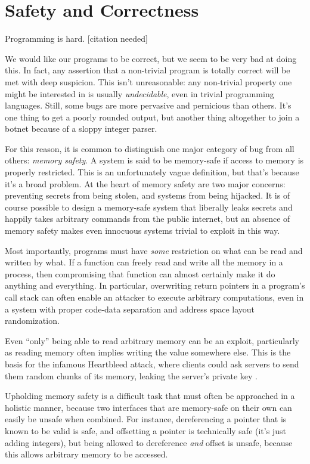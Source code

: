 \chapter{Safety and Correctness}
\label{ch:problems}

Programming is hard. [citation needed]

We would like our programs to be correct, but we seem to be very bad at doing
this. In fact, any assertion that a non-trivial program is totally correct
will be met with deep suspicion. This isn't unreasonable: any non-trivial property
one might be interested in is usually \emph{undecidable}, even in trivial programming
languages. Still, some bugs are more pervasive and pernicious than others.
It's one thing to get a poorly rounded output, but another thing altogether
to join a botnet because of a sloppy integer parser.

For this reason, it is common to distinguish one major category of bug from
all others: \emph{memory safety}. A system is said to be memory-safe if access to memory is
properly restricted. This is an unfortunately vague definition, but that's because
it's a broad problem. At the heart of memory safety are two major concerns:
preventing secrets from being stolen, and systems from being hijacked. It is
of course possible to design a memory-safe system that liberally leaks secrets
and happily takes arbitrary commands from the public internet, but an absence
of memory safety makes even innocuous systems trivial to exploit in this way.

Most importantly, programs must have \emph{some} restriction on what can be read
and written by what. If a function can freely read and write all the memory
in a process, then compromising that function can almost certainly make it do
anything and everything. In particular, overwriting return pointers in a
program's call stack can often enable an attacker to execute arbitrary
computations, even in a system with proper code-data separation and address
space layout randomization. \cite{buchanan2008good}

Even ``only'' being able to read arbitrary memory can be an exploit, particularly
as reading memory often implies writing the value somewhere else. This is the
basis for the infamous Heartbleed attack, where clients could ask servers
to send them random chunks of its memory, leaking the server's private key
\cite{schneier2014heartbleed}.

Upholding memory safety is a difficult task that must often be approached in
a holistic manner, because two interfaces that are memory-safe on their own can easily
be unsafe when combined. For instance, dereferencing a pointer that is known
to be valid is safe, and offsetting a pointer is technically safe (it's just adding integers),
but being allowed to dereference \emph{and} offset is unsafe, because this allows
arbitrary memory to be accessed.

